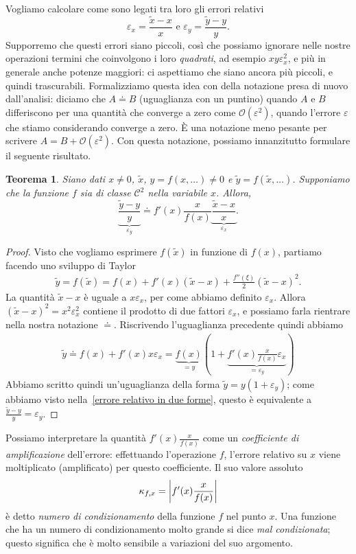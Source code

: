 \documentclass[a4paper]{report}
\DeclarePairedDelimiter{\abs}{\lvert}{\rvert}
\newtheorem{theorem}{Teorema}[chapter]
\theoremstyle{definition}
\theoremstyle{remark}
\begin{document}
Vogliamo calcolare come sono legati tra loro gli errori relativi
\[
\varepsilon_x = \frac{\tilde{x}-x}{x} \text{ e } \varepsilon_y = \frac{\tilde{y}-y}{y}.
\]
Supporremo che questi errori siano piccoli, così che possiamo ignorare nelle nostre operazioni termini che coinvolgono i loro \emph{quadrati}, ad esempio $xy\varepsilon_x^2$, e più in generale anche potenze maggiori: ci aspettiamo che siano ancora più piccoli, e quindi trascurabili. Formalizziamo questa idea con della notazione presa di nuovo dall'analisi: diciamo che $A \doteq B$ (uguaglianza con un puntino) quando $A$ e $B$ differiscono per una quantità che converge a zero come $\mathcal{O}(\varepsilon^2)$, quando l'errore $\varepsilon$ che stiamo considerando converge a zero. È una notazione meno pesante per scrivere $A = B + \mathcal{O}(\varepsilon^2)$. Con questa notazione, possiamo innanzitutto formulare il seguente risultato.
\begin{theorem}
     Siano dati $x\neq 0$, $\tilde{x}$, $y = f(x,\dots) \neq 0$ e $\tilde{y}= f(\tilde{x}, \dots)$. Supponiamo che la funzione $f$ sia di classe $\mathcal{C}^2$ nella variabile $x$. Allora,
     \begin{equation} \label{ampliferrore}
     \underbrace{\frac{\tilde{y}-y}{y}}_{\varepsilon_y} \doteq f'(x) \frac{x}{f(x)} \underbrace{\frac{\tilde{x}-x}{x}}_{\varepsilon_x}.        
     \end{equation}
\end{theorem}
\begin{proof}
    Visto che vogliamo esprimere $f(\tilde{x})$ in funzione di $f(x)$, partiamo facendo uno sviluppo di Taylor
    \begin{align*}
        \tilde{y} = f(\tilde{x}) = f(x) + f'(x)(\tilde{x}-x) + \frac{f''(\xi)}{2}(\tilde{x}-x)^2.
    \end{align*}
    La quantità $\tilde{x}-x$ è uguale a $x\varepsilon_x$, per come abbiamo definito $\varepsilon_x$. Allora $(\tilde{x}-x)^2 = x^2\varepsilon_x^2$ contiene il prodotto di due fattori $\varepsilon_x$, e possiamo farla rientrare nella nostra notazione $\doteq$. Riscrivendo l'uguaglianza precedente quindi abbiamo
    \begin{align*}
        \tilde{y} \doteq f(x) + f'(x)x\varepsilon_x = \underbrace{f(x)}_{=y} \left(1 + \underbrace{f'(x)\frac{x}{f(x)}\varepsilon_x}_{=\varepsilon_y}\right)
    \end{align*}
    Abbiamo scritto quindi un'uguaglianza della forma $\tilde{y} = y (1+\varepsilon_y)$; come abbiamo visto nella~\eqref{errore relativo in due forme}, questo è equivalente a $\frac{\tilde{y}-y}{y} = \varepsilon_y$.
\end{proof}
Possiamo interpretare la quantità $f'(x)\frac{x}{f(x)}$ come un \emph{coefficiente di amplificazione} dell'errore: effettuando l'operazione $f$, l'errore relativo su $x$ viene moltiplicato (amplificato) per questo coefficiente. Il suo valore assoluto
\[
\kappa_{f,x} = \abs*{f'(x)\frac{x}{f(x)}}
\]
è detto \emph{numero di condizionamento} della funzione $f$ nel punto $x$. Una funzione che ha un numero di condizionamento molto grande si dice \emph{mal condizionata}; questo significa che è molto sensibile a variazioni del suo argomento.
\end{document}
